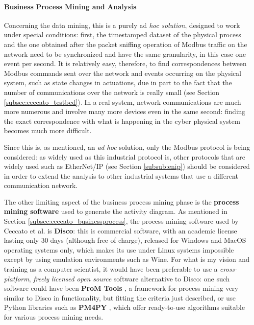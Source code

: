 \paragraph{Business Process Mining and Analysis}
Concerning the data mining, this is a purely ad \textit{hoc solution}, designed to work under special conditions: first, the timestamped dataset of the physical process and the one obtained after the packet sniffing operation of Modbus traffic on the network need to be synchronized and have the same granularity, in this case one event per second.\newline
It is relatively easy, therefore, to find correspondences between Modbus commands sent over the network and events occurring on the physical system, such as state changes in actuations, due in part to the fact that the number of communications over the network is really small (see Section \ref{subsec:ceccato_testbed}). In a real system, network communications are much more numerous and involve many more devices even in the same second: finding the exact correspondence with what is happening in the cyber physical system becomes much more difficult.

\bigskip
Since this is, as mentioned, an \textit{ad hoc} solution, only the Modbus protocol is being considered: as widely used as this industrial protocol is, other protocols that are widely used such as EtherNet/IP (see Section \ref{subsub:enip}) should be considered in order to extend the analysis to other industrial systems that use a different communication network.

\bigskip
The other limiting aspect of the business process mining phase is the \textbf{process mining software} used to generate the activity diagram. As mentioned in Section \ref{subsec:ceccato_businessprocess}, the process mining software used by Ceccato et al. is \textbf{Disco}: this is commercial software, with an academic license lasting only 30 days (although free of charge), released for Windows and MacOS operating systems only, which makes its use under Linux systems impossible except by using emulation environments such as Wine.\newline
For what is my vision and training as a computer scientist, it would have been preferable to use a \textit{cross-platform}, \textit{freely licensed open source} software alternative to Disco: one such software could have been \textbf{ProM Tools} \cite{prom_tools}, a framework for process mining very similar to Disco in functionality, but fitting the criteria just described, or use Python libraries such as \textbf{PM4PY} \cite{pm4py}, which offer ready-to-use algorithms suitable for various process mining needs.

